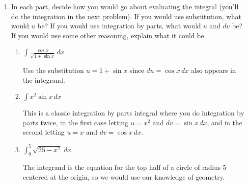 \documentclass[main]{subfiles}
\begin{document}
\begin{enumerate}
\item 
{}

In each part, decide how you would go about evaluating the integral (you'll do the integration in the next problem). If you would use substitution, what would $u$ be? If you would use integration by parts, what would $u$ and $dv$ be? If you would use some other reasoning, explain what it could be.

\begin{enumerate}
    \item 
    \begin{problem}[\vfill]
        $\displaystyle \int \frac{\cos x}{\sqrt{1+\sin x}}\, dx$
    \end{problem}

    \begin{solution}
        Use the substitution $u=1+\sin x$ since $du = \cos x\,dx$ also
        appears in the integrand.


    \end{solution}



    \item
    \begin{problem}[\vfill\newpage]
        $\displaystyle \int x^2 \sin x\, dx$
    \end{problem}

    \begin{solution}
        This is a classic integration by parts integral where you
        do integration by parts twice, in the first case letting
        $u=x^2$ and $dv= \sin x \, dx$, and in the second
        letting $u=x$ and $dv = \cos x \, dx$.
    \end{solution}

    \item 
    \begin{problem}[\vfill]
        $\displaystyle \int_0^5 \sqrt{25-x^2}\;dx$
    \end{problem}

    \begin{solution}
        The integrand is the equation for the top half of a circle of radius 5 centered at the origin, so we would use our knowledge of geometry.
      
    \end{solution}


\end{enumerate}
\end{enumerate}
\end{document}
